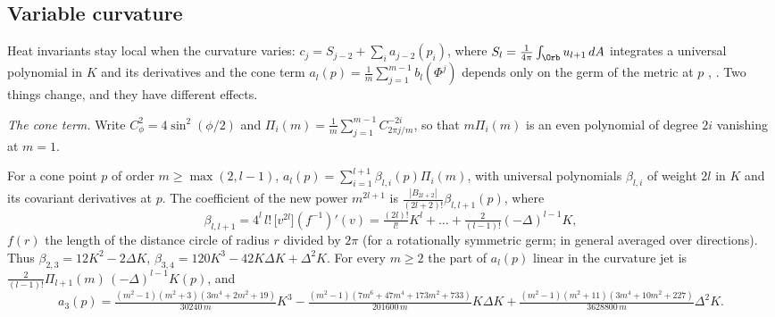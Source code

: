 
\subsection{Variable curvature}\label{sec:varcurv}

Heat invariants stay local when the curvature varies: $c_j=S_{j-2}+\sum_ia_{j-2}(p_i)$, where
$S_l=\frac1{4\pi}\int_\Orb u_{l+1}\,dA$ integrates a universal polynomial in $K$ and its derivatives and the
cone term $a_l(p)=\frac1m\sum_{j=1}^{m-1}b_l(\Phi^j)$ depends only on the germ of the metric at $p$
\cite{donnelly1976}, \cite[4.1, Thm~4.8]{dggw2008}. Two things change, and they have different effects.

\emph{The cone term.} Write $C_\phi^2=4\sin^2(\phi/2)$ and $\Pi_i(m)=\frac1m\sum_{j=1}^{m-1}C_{2\pi j/m}^{-2i}$, so
that $m\Pi_i(m)$ is an even polynomial of degree $2i$ vanishing at $m=1$.

\begin{proposition}\label{prop:varcone}
For a cone point $p$ of order $m\ge\max(2,l-1)$,
$a_l(p)=\sum_{i=1}^{l+1}\beta_{l,i}(p)\Pi_i(m)$, with universal polynomials $\beta_{l,i}$ of weight $2l$ in $K$
and its covariant derivatives at $p$. The coefficient of the new power $m^{2l+1}$ is
$\frac{|B_{2l+2}|}{(2l+2)!}\beta_{l,l+1}(p)$, where
\[
\beta_{l,l+1}=4^l\,l!\,\bigl[v^{2l}\bigr](f^{-1})'(v)
=\tfrac{(2l)!}{l!}K^l+\dots+\tfrac{2}{(l-1)!}(-\Delta)^{l-1}K ,
\]
$f(r)$ the length of the distance circle of radius $r$ divided by $2\pi$ (for a rotationally symmetric germ;
in general averaged over directions). Thus $\beta_{2,3}=12K^2-2\Delta K$, $\beta_{3,4}=120K^3-42K\Delta K+\Delta^2K$.
For every $m\ge2$ the part of $a_l(p)$ linear in the curvature jet is
$\frac{2}{(l-1)!}\Pi_{l+1}(m)\,(-\Delta)^{l-1}K(p)$, and
\[
a_3(p)=\tfrac{(m^2-1)(m^2+3)(3m^4+2m^2+19)}{30240\,m}K^3
-\tfrac{(m^2-1)(7m^6+47m^4+173m^2+733)}{201600\,m}K\Delta K
+\tfrac{(m^2-1)(m^2+11)(3m^4+10m^2+227)}{3628800\,m}\Delta^2K .
\]
\end{proposition}


